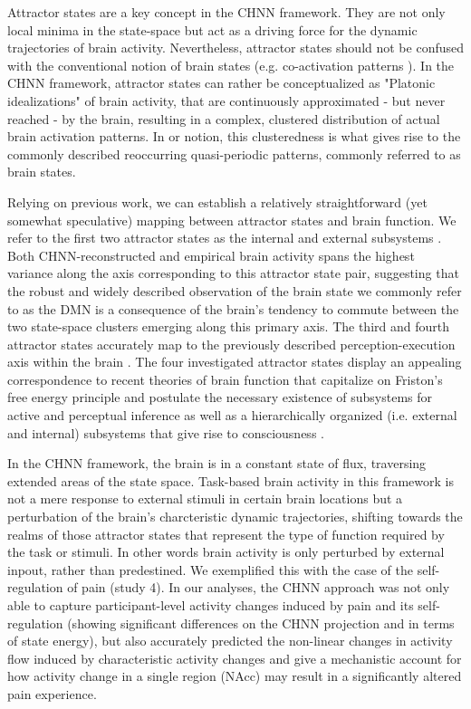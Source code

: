 \documentclass{article}
\begin{document}
Attractor states are a key concept in the CHNN framework. They are not only local minima in the state-space but act as a driving force for the dynamic trajectories of brain activity. Nevertheless, attractor states should not be confused with the conventional notion of brain states (e.g. co-activation patterns \citep{chen2015introducing}). In the CHNN framework, attractor states can rather be conceptualized as "Platonic idealizations" of brain activity, that are continuously approximated - but never reached - by the brain, resulting in a complex, clustered distribution of actual brain activation patterns. In or notion, this clusteredness is what gives rise to the commonly described reoccurring quasi-periodic patterns, commonly referred to as brain states.

Relying on previous work, we can establish a relatively straightforward (yet somewhat speculative) mapping between attractor states and brain function. We refer to the first two attractor states as the internal and external subsystems \citep{golland2008data, cioli2014differences}. Both CHNN-reconstructed and empirical brain activity spans the highest variance along the axis corresponding to this attractor state pair, suggesting that the robust and widely described observation of the brain state we commonly refer to as the DMN is a consequence of the brain's tendency to commute between the two state-space clusters emerging along this primary axis.
The third and fourth attractor states accurately map to the previously described perception-execution axis within the brain \citep{fuster2004upper}. The four investigated attractor states display an appealing correspondence to recent theories of brain function that capitalize on Friston's free energy principle \citep{friston2006free} and postulate the necessary existence of subsystems for active and perceptual inference \citep{friston2023free} as well as a hierarchically organized (i.e. external and internal) subsystems that give rise to consciousness \citep{ramstead2023inner}.

In the CHNN framework, the brain is in a constant state of flux, traversing extended areas of the state space. Task-based brain activity in this framework is not a mere response to external stimuli in certain brain locations but a perturbation of the brain's charcteristic dynamic trajectories, shifting towards the realms of those attractor states that represent the type of function required by the task or stimuli. In other words brain activity is only perturbed by external inpout, rather than predestined. We exemplified this with the case of the self-regulation of pain (study 4).
In our analyses, the CHNN approach was not only able to capture participant-level activity changes induced by pain and its self-regulation (showing significant differences on the CHNN projection and in terms of state energy), but also accurately predicted the non-linear changes in activity flow induced by characteristic activity changes and give a mechanistic account for how activity change in a single region (NAcc) may result in a significantly altered pain experience.
\end{document}
